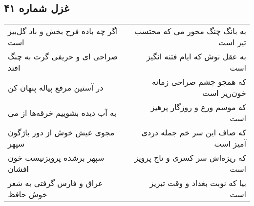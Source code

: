 \begin{center}
\section*{غزل شماره ۴۱}
\label{sec:sh041}
\begin{longtable}{l p{0.5cm} r}
اگر چه باده فرح بخش و باد گل‌بیز است
&&
به بانگ چنگ مخور می که محتسب تیز است
\\
صراحی ای و حریفی گرت به چنگ افتد
&&
به عقل نوش که ایام فتنه انگیز است
\\
در آستین مرقع پیاله پنهان کن
&&
که همچو چشم صراحی زمانه خون‌ریز است
\\
به آب دیده بشوییم خرقه‌ها از می
&&
که موسم ورع و روزگار پرهیز است
\\
مجوی عیش خوش از دور باژگون سپهر
&&
که صاف این سر خم جمله دردی آمیز است
\\
سپهر برشده پرویزنیست خون افشان
&&
که ریزه‌اش سر کسری و تاج پرویز است
\\
عراق و فارس گرفتی به شعر خوش حافظ
&&
بیا که نوبت بغداد و وقت تبریز است
\\
\end{longtable}
\end{center}
